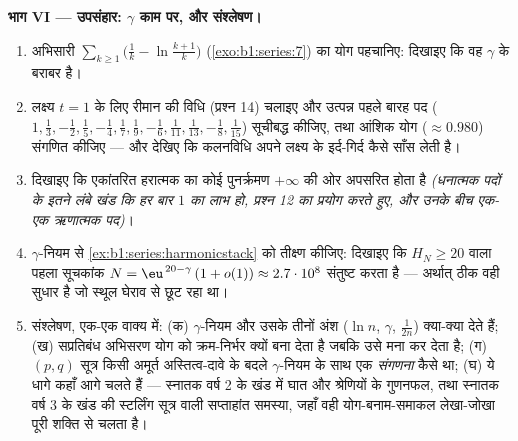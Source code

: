 \begin{problem}[{सप्ताहांत समस्या --- $H_n = \ln n + \gamma +
\frac{1}{2n} + O(n^{-2})$, और $1 - \frac12 +
\frac13 - \dots$ को पुनर्क्रमित करके $\frac{\ln 2}{2}$}]
\medskip \noindent\textbf{भाग VI --- उपसंहार: $\gamma$ काम पर, और संश्लेषण।}
\begin{enumerate}[resume]
  \item अभिसारी  $\sum_{k\geq1} \bigl(\frac1k -
  \ln\frac{k+1}{k}\bigr)$ (\cref{exo:b1:series:7}) का योग पहचानिए: दिखाइए कि
  वह $\gamma$ के बराबर है।
  \item लक्ष्य $t = 1$ के लिए रीमान की विधि (प्रश्न 14) चलाइए और उत्पन्न
  पहले बारह पद ($1, \frac13, -\frac12, \frac15, -\frac14, \frac17, \frac19,
  -\frac16, \frac1{11}, \frac1{13}, -\frac18, \frac1{15}$) सूचीबद्ध कीजिए,
  तथा आंशिक योग ($\approx 0.980$) संगणित कीजिए --- और देखिए कि कलनविधि अपने
  लक्ष्य के इर्द-गिर्द कैसे साँस लेती है।
  \item दिखाइए कि एकांतरित हरात्मक  का कोई पुनर्क्रमण $+\infty$ की ओर
  अपसरित होता है \emph{(धनात्मक पदों के इतने लंबे खंड कि हर बार $1$ का लाभ
  हो, प्रश्न 12 का प्रयोग करते हुए, और उनके बीच एक-एक ऋणात्मक पद)}।
  \item $\gamma$-नियम से \cref{ex:b1:series:harmonicstack} को तीक्ष्ण कीजिए:
  दिखाइए कि $H_N \geq 20$ वाला पहला सूचकांक $N = \eu^{\,20 - \gamma}\,(1 +
  o(1)) \approx 2.7\cdot10^{8}$ संतुष्ट करता है --- अर्थात्  ठीक
  वही सुधार है जो स्थूल घेराव से छूट रहा था।
  \item संश्लेषण, एक-एक वाक्य में: (क) $\gamma$-नियम और उसके तीनों अंश ($\ln
  n$, $\gamma$, $\frac{1}{2n}$) क्या-क्या देते हैं; (ख) सप्रतिबंध अभिसरण योग
  को क्रम-निर्भर क्यों बना देता है जबकि  उसे मना कर देता है;
  (ग) $(p,q)$ सूत्र किसी अमूर्त अस्तित्व-दावे के बदले $\gamma$-नियम के साथ
  एक \emph{संगणना} कैसे था; (घ) ये धागे कहाँ आगे चलते हैं --- स्नातक वर्ष 2
  के खंड में घात  और श्रेणियों के गुणनफल, तथा स्नातक वर्ष 3 के खंड की
  स्टर्लिंग सूत्र वाली सप्ताहांत समस्या, जहाँ वही योग-बनाम-समाकल लेखा-जोखा
  पूरी शक्ति से चलता है।
\end{enumerate}
\end{problem}
